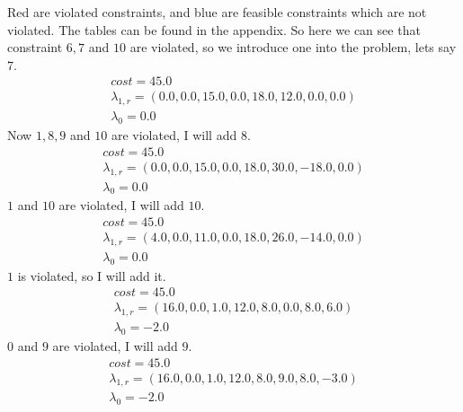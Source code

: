 \documentclass{article}
\begin{document}
    Red are violated constraints, and blue are feasible constraints which are not violated.
    The tables can be found in the appendix.
    So here we can see that constraint $6,7$ and $10$ are violated, so we introduce one into the problem, lets say $7$.
    \begin{equation*}
        \begin{array}{c}
            cost = 45.0\\
            \lambda_{1,r} = (0.0,0.0,15.0,0.0,18.0,12.0,0.0,0.0)\\
            \lambda_0 = 0.0
        \end{array}
    \end{equation*}
    Now $1,8,9$ and $10$ are violated, I will add $8$.
    \begin{equation*}
        \begin{array}{c}
            cost = 45.0\\
            \lambda_{1,r} = (0.0,0.0,15.0,0.0,18.0,30.0,-18.0,0.0)\\
            \lambda_0 = 0.0
        \end{array}
    \end{equation*}
    $1$ and $10$ are violated, I will add $10$.
    \begin{equation*}
        \begin{array}{c}
            cost = 45.0\\
            \lambda_{1,r} = (4.0,0.0,11.0,0.0,18.0,26.0,-14.0,0.0)\\
            \lambda_0 = 0.0
        \end{array}
    \end{equation*}
    $1$ is violated, so I will add it.
    \begin{equation*}
        \begin{array}{c}
            cost = 45.0\\
            \lambda_{1,r} = (16.0,0.0,1.0,12.0,8.0,0.0,8.0,6.0)\\
            \lambda_0 = -2.0
        \end{array}
    \end{equation*}
    $0$ and $9$ are violated, I will add $9$.
    \begin{equation*}
        \begin{array}{c}
            cost = 45.0\\
            \lambda_{1,r} = (16.0,0.0,1.0,12.0,8.0,9.0,8.0,-3.0)\\
            \lambda_0 = -2.0
        \end{array}
    \end{equation*}
\end{document}
